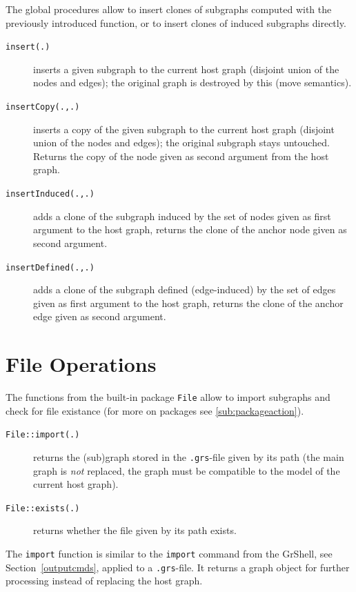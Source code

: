 The global procedures allow to insert clones of subgraphs computed with the previously introduced function,
or to insert clones of induced subgraphs directly.

\begin{description}
\item[\texttt{insert(.)}] inserts a given subgraph to the current host graph (disjoint union of the nodes and edges); the original graph is destroyed by this (move semantics).
\item[\texttt{insertCopy(.,.)}] inserts a copy of the given subgraph to the current host graph (disjoint union of the nodes and edges); the original subgraph stays untouched. Returns the copy of the node given as second argument from the host graph.
\item[\texttt{insertInduced(.,.)}] adds a clone of the subgraph induced by the set of nodes given as first argument to the host graph, returns the clone of the anchor node given as second argument.
\item[\texttt{insertDefined(.,.)}] adds a clone of the subgraph defined (edge-induced) by the set of edges given as first argument to the host graph, returns the clone of the anchor edge given as second argument.
\end{description}

\section{File Operations}\label{sec:fileop}

The functions from the built-in package \texttt{File} allow to import subgraphs and check for file existance (for more on packages see \ref{sub:packageaction}).

\begin{description}
\item[\texttt{File::import(.)}] returns the (sub)graph stored in the \texttt{.grs}-file given by its path (the main graph is \emph{not} replaced, the graph must be compatible to the model of the current host graph).
\item[\texttt{File::exists(.)}] returns whether the file given by its path exists.
\end{description}

The \texttt{import} function is similar to the \texttt{import} command from the GrShell, see Section~\ref{outputcmds}, applied to a \texttt{.grs}-file. It returns a graph object for further processing instead of replacing the host graph.

